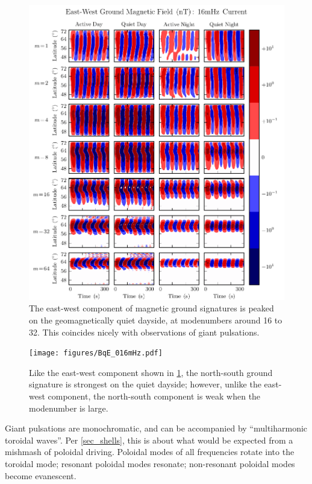 \begin{figure}[H]
    \centering
    \includegraphics[width=\textwidth]{figures/BfE_016mHz.pdf}
    \caption[East-West Ground Magnetic Fields: 16mHz]{
      The east-west component of magnetic ground signatures is peaked on the geomagnetically quiet dayside, at modenumbers around 16 to 32. This coincides nicely with observations of giant pulsations. 
    }
    \label{fig_BfE_016mHz}
\end{figure}

\begin{figure}[H]
    \centering
    \texttt{[image: figures/BqE\_016mHz.pdf]}
    \caption[North-South Ground Magnetic Fields: 16mHz]{
      Like the east-west component shown in \cref{fig_BfE_016mHz}, the north-south ground signature is strongest on the quiet dayside; however, unlike the east-west component, the north-south component is weak when the modenumber is large. 
    }
    \label{fig_BqE_016mHz}
\end{figure}

Giant pulsations are monochromatic, and can be accompanied by ``multiharmonic toroidal waves''\cite{takahashi_2011}. Per \cref{sec_shells}, this is about what would be expected from a mishmash of poloidal driving. Poloidal modes of all frequencies rotate into the toroidal mode; resonant poloidal modes resonate; non-resonant poloidal modes become evanescent. 

